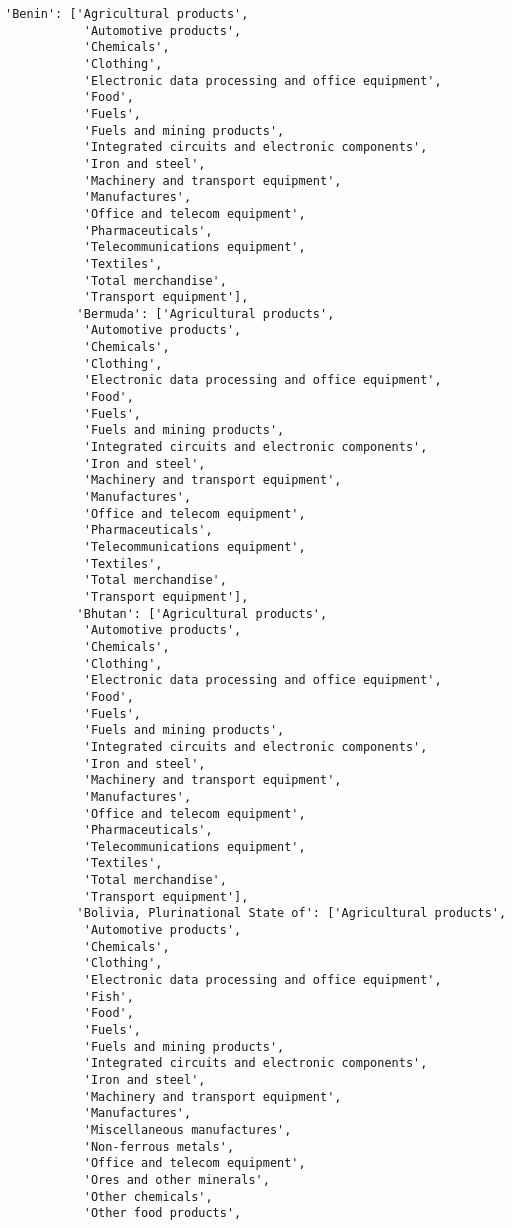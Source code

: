 \documentclass[11pt]{article}
\begin{document}
\begin{Verbatim}[commandchars=\\\{\}]
          'Benin': ['Agricultural products',
           'Automotive products',
           'Chemicals',
           'Clothing',
           'Electronic data processing and office equipment',
           'Food',
           'Fuels',
           'Fuels and mining products',
           'Integrated circuits and electronic components',
           'Iron and steel',
           'Machinery and transport equipment',
           'Manufactures',
           'Office and telecom equipment',
           'Pharmaceuticals',
           'Telecommunications equipment',
           'Textiles',
           'Total merchandise',
           'Transport equipment'],
          'Bermuda': ['Agricultural products',
           'Automotive products',
           'Chemicals',
           'Clothing',
           'Electronic data processing and office equipment',
           'Food',
           'Fuels',
           'Fuels and mining products',
           'Integrated circuits and electronic components',
           'Iron and steel',
           'Machinery and transport equipment',
           'Manufactures',
           'Office and telecom equipment',
           'Pharmaceuticals',
           'Telecommunications equipment',
           'Textiles',
           'Total merchandise',
           'Transport equipment'],
          'Bhutan': ['Agricultural products',
           'Automotive products',
           'Chemicals',
           'Clothing',
           'Electronic data processing and office equipment',
           'Food',
           'Fuels',
           'Fuels and mining products',
           'Integrated circuits and electronic components',
           'Iron and steel',
           'Machinery and transport equipment',
           'Manufactures',
           'Office and telecom equipment',
           'Pharmaceuticals',
           'Telecommunications equipment',
           'Textiles',
           'Total merchandise',
           'Transport equipment'],
          'Bolivia, Plurinational State of': ['Agricultural products',
           'Automotive products',
           'Chemicals',
           'Clothing',
           'Electronic data processing and office equipment',
           'Fish',
           'Food',
           'Fuels',
           'Fuels and mining products',
           'Integrated circuits and electronic components',
           'Iron and steel',
           'Machinery and transport equipment',
           'Manufactures',
           'Miscellaneous manufactures',
           'Non-ferrous metals',
           'Office and telecom equipment',
           'Ores and other minerals',
           'Other chemicals',
           'Other food products',

\end{Verbatim}
\end{document}
